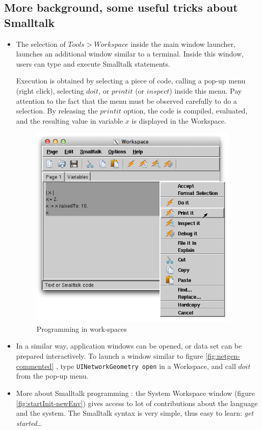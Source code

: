 \documentclass[times]{book}
\begin{document}
\subsection{More background, some useful tricks about Smalltalk}

\begin{itemize}
\item 
The selection of  $Tools>Workspace$ inside the main window launcher, launches an additional
window similar to a terminal. Inside this window, users can type and execute Smalltalk statements.

Execution is obtained by selecting a piece of code, calling a pop-up menu (right click), selecting 
$do it$, or $ print it$ (or $inspect$) inside this menu. Pay attention to the fact that the menu must be observed
carefully to do a selection. By releasing the $print it$ option, the code is compiled, evaluated, and 
the resulting value in variable $x$ is displayed in the Workspace.


\begin{figure}[hbtp]
\begin{center} 
\includegraphics[width=10cm]{printIt.png}
\caption{Programming in work-spaces}
\label{fig:printIt}
\end{center}
\end{figure}
 
\item 
In a similar way, application windows can be opened, or data set can be prepared
interactively. To launch a window similar to figure \ref{fig:netgen-commented}  , type {\tt UINetworkGeometry open}
in a Workspace,
and call $do it$ from the pop-up menu.

\item 
More about Smalltalk programming : the System Workspace window (figure \ref{fig:startInit-newEnv}) gives access to lot of contributions about the
language and the system. The Smalltalk syntax is very simple, thus easy to learn: {\sl get started}\ldots 


\end{itemize}
\end{document}
